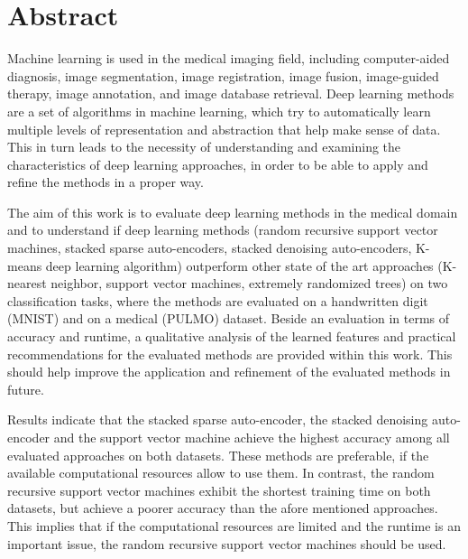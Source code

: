 

\chapter*{Abstract}%
Machine learning is used in the medical imaging field, including computer-aided diagnosis, image
segmentation, image registration, image fusion, image-guided therapy, image annotation,
and image database retrieval. Deep learning methods are a set of algorithms in machine learning,
which try to automatically learn multiple levels of representation and abstraction that help
make sense of data. This in turn leads to the necessity of understanding and examining the characteristics
of deep learning approaches, in order to be able to apply and refine the methods in a
proper way.

The aim of this work is to evaluate deep learning methods in the medical domain and to
understand if deep learning methods (random recursive support vector machines, stacked sparse
auto-encoders, stacked denoising auto-encoders, K-means deep learning algorithm) outperform
other state of the art approaches (K-nearest neighbor, support vector machines, extremely randomized
trees) on two classification tasks, where the methods are evaluated on a handwritten
digit (MNIST) and on a medical (PULMO) dataset. Beside an evaluation in terms of accuracy
and runtime, a qualitative analysis of the learned features and practical recommendations for the
evaluated methods are provided within this work. This should help improve the application and
refinement of the evaluated methods in future.

Results indicate that the stacked sparse auto-encoder, the stacked denoising auto-encoder
and the support vector machine achieve the highest accuracy among all evaluated approaches on
both datasets. These methods are preferable, if the available computational resources allow to
use them. In contrast, the random recursive support vector machines exhibit the shortest training
time on both datasets, but achieve a poorer accuracy than the afore mentioned approaches. This
implies that if the computational resources are limited and the runtime is an important issue, the
random recursive support vector machines should be used.

